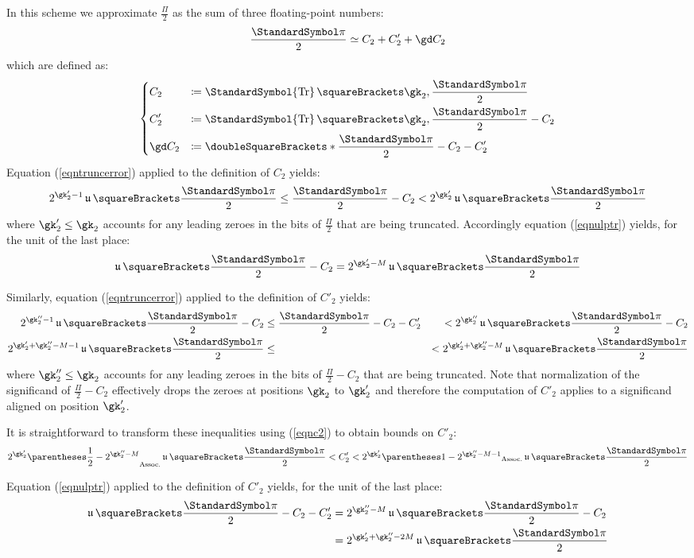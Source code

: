 \documentclass[10pt, a4paper, twoside]{basestyle}
\DeclareMathOperator{\ULP}{\mathfrak u}
\DeclareMathOperator{\truncate}{\StandardSymbol{Tr}}
\newcommand{\round}[1]{\doubleSquareBrackets*{#1}}
\begin{document}
In this scheme we approximate $\frac{\Pi}{2}$ as the sum of three floating-point numbers:
\[
\frac{\Pi}{2} \simeq C_2 + C'_2 + \gd C_2
\]
which are defined as:
\begin{equation*}
\begin{dcases}
C_2 &\DefineAs \truncate\of{\gk_2, \frac{\Pi}{2}} \\
C'_2 &\DefineAs \truncate\of{\gk_2, \frac{\Pi}{2} - C_2} \\
\gd C_2 &\DefineAs \round{\frac{\Pi}{2} - C_2 - C'_2}
\end{dcases}
\end{equation*}
Equation (\ref{eqntruncerror}) applied to the definition of $C_2$ yields:
\begin{equation}
2^{\gk'_2 - 1} \ULP\of{\frac{\Pi}{2}} \leq \frac{\Pi}{2} - C_2 < 2^{\gk'_2} \ULP\of{\frac{\Pi}{2}}
\label{eqnc2}
\end{equation}
where $\gk'_2 \leq \gk_2$ accounts for any leading zeroes in the bits of $\frac{\Pi}{2}$ that are being truncated.  Accordingly equation (\ref{eqnulptr}) yields, for the unit of the last place:
\[
\ULP\of{\frac{\Pi}{2} - C_2} = 2^{\gk'_2 - M} \ULP\of{\frac{\Pi}{2}}
\]

Similarly, equation (\ref{eqntruncerror}) applied to the definition of $C'_2$ yields:
\begin{alignat*}{2}
2^{\gk''_2 - 1} \ULP\of{\frac{\Pi}{2} - C_2} &\leq \frac{\Pi}{2} - C_2 - C'_2 &< 2^{\gk''_2} \ULP\of{\frac{\Pi}{2} - C_2} \\
2^{\gk'_2 + \gk''_2 - M - 1} \ULP\of{\frac{\Pi}{2}} &\leq &< 2^{\gk'_2 + \gk''_2 - M} \ULP\of{\frac{\Pi}{2}}
\end{alignat*}
where $\gk''_2 \leq \gk_2$ accounts for any leading zeroes in the bits of $\frac{\Pi}{2} - C_2$ that are being truncated.  Note that normalization of the significand of $\frac{\Pi}{2} - C_2$ effectively drops the zeroes at positions $\gk_2$ to $\gk'_2$ and therefore the computation of $C'_2$ applies to a significand aligned on position $\gk'_2$.

It is straightforward to transform these inequalities using (\ref{eqnc2}) to obtain bounds on $C'_2$:
\[
2^{\gk'_2} \pa{\frac{1}{2} - 2^{\gk''_2 - M}} \ULP\of{\frac{\Pi}{2}} < C'_2 < 2^{\gk'_2} \pa{1 - 2^{\gk''_2 - M - 1}} \ULP\of{\frac{\Pi}{2}}
\]

Equation (\ref{eqnulptr}) applied to the definition of $C'_2$ yields, for the unit of the last place:
\begin{align*}
\ULP\of{\frac{\Pi}{2} - C_2 - C'_2} &= 2^{\gk''_2 - M} \ULP\of{\frac{\Pi}{2} - C_2} \\
&= 2^{\gk'_2 + \gk''_2 - 2 M} \ULP\of{\frac{\Pi}{2}}
\end{align*}
\end{document}
